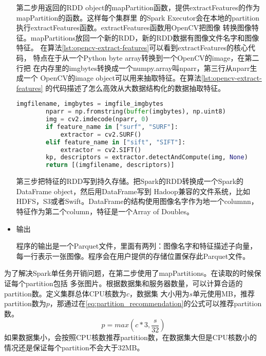 \begin{itemize}
        第二步用返回的RDD object的mapPartition函数，提供extractFeatures的作为mapPartition的函数。这样每个集群里
        的Spark Executor会在本地的partition执行extractFeatures函数。extractFeatures函数用OpenCV把图像
        转换图像特征。mapPartitions放回一个新的RDD，新的RDD数据有图像文件名字和图像特征。
        在算法\ref{lst:opencv-extract-features}可以看到extractFeatures的核心代码，
        特点在于从一个Python byte array转换到一个OpenCV的image，在第二行把
        在内存里的imgbytes转换成一个numpy.array叫nparr，第三行从nparr生成一个
        OpenCV的image object可以用来抽取特征。在算法\ref{lst:opencv-extract-features}
        的代码描述了怎么高效从大数据结构化的数据抽取特征。
        \begin{minipage}{\linewidth}
        \begin{lstlisting}[language=Python,
                           basicstyle=\small,
                           showstringspaces=false,
                           caption={OpenCV从内存读取图像抽取特征},
                           label={lst:opencv-extract-features}]
        imgfilename, imgbytes = imgfile_imgbytes
        nparr = np.fromstring(buffer(imgbytes), np.uint8)
        img = cv2.imdecode(nparr, 0)
        if feature_name in ["surf", "SURF"]:
            extractor = cv2.SURF()
        elif feature_name in ["sift", "SIFT"]:
            extractor = cv2.SIFT()
        kp, descriptors = extractor.detectAndCompute(img, None)
        return [(imgfilename, descriptors)]
        \end{lstlisting}
        \end{minipage}

        第三步把特征的RDD写到持久存储。把Spark的RDD转换成一个Spark的DataFrame object，然后用DataFrame写到
        Hadoop兼容的文件系统，比如HDFS，S3或者Swift。DataFrame的结构使用图像名字作为地一个columnn，
        特征作为第二个column，特征是一个Array of Doubles。


  \item 输出

        程序的输出是一个Parquet文件，里面有两列：图像名字和特征描述子向量，
        每一行表示一张图像。程序会在用户提供的存储位置保存此Parquet文件。

\end{itemize}

为了解决Spark单任务开销问题，在第二步使用了mapPartitions。在读取的时候保证每个partition包括
多张图片。根据数据集和服务器数量，可以计算合适的partition数。定义集群总体CPU核数为$c$，数据集
大小用为$s$单元使用MB，推荐partition数为$p$，那通过在\ref{eq:partition_recommendation}的公式可以推荐partition数。
\begin{equation} \label{eq:partition_recommendation}
p = max(c * 3, \frac{s}{32})
\end{equation}
如果数据集小，会按照CPU核数推荐partition数，在数据集大但是CPU核数小的情况还是保证每个partition不会大于32MB。




